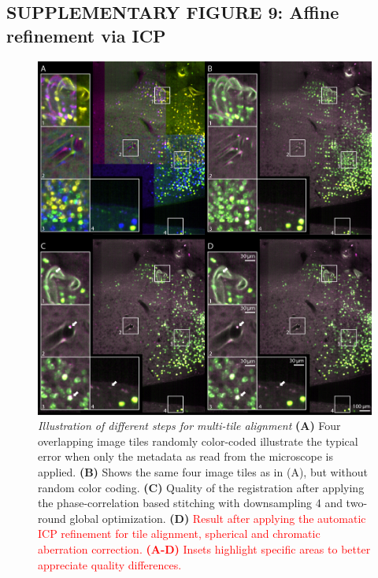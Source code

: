 \documentclass[]{spie}  %
\def\red{\textcolor{red}}
\begin{document}
\subsection*{SUPPLEMENTARY FIGURE 9: Affine refinement via ICP}
\vspace{1mm}
\begin{figure}[h!]
\includegraphics[width=\textwidth]{fig-stitching_icp.jpg}
\vspace{-2.0mm}
\caption{\hspace{-0.5mm} \emph{Illustration of different steps for multi-tile alignment} \textbf{(A)} Four overlapping image tiles randomly color-coded illustrate the typical error when only the metadata as read from the microscope is applied. \textbf{(B)} Shows the same four image tiles as in (A), but without random color coding. \textbf{(C)} Quality of the registration after applying the phase-correlation based stitching with downsampling 4 and two-round global optimization. \textbf{(D)} \red{Result after applying the automatic ICP refinement for tile alignment, spherical and chromatic aberration correction. \textbf{(A-D)} Insets highlight specific areas to better appreciate quality differences.}
}
\label{fig:sup-fig-icp}
\end{figure}
\end{document}
